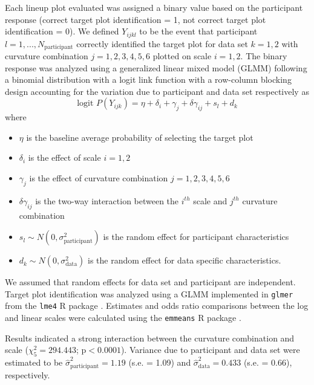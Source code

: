 \documentclass[12pt]{article}
\begin{document}
Each lineup plot evaluated was assigned a binary value based on the
participant response (correct target plot identification = 1, not
correct target plot identification = 0). We defined \(Y_{ijkl}\) to be
the event that participant \(l = 1,...,N_\text{participant}\) correctly
identified the target plot for data set \(k = 1,2\) with curvature
combination \(j = 1,2,3,4,5,6\) plotted on scale \(i = 1,2\). The binary
response was analyzed using a generalized linear mixed model (GLMM)
following a binomial distribution with a logit link function with a
row-column blocking design accounting for the variation due to
participant and data set respectively as \begin{equation}
\text{logit }P(Y_{ijk}) = \eta + \delta_i + \gamma_j + \delta \gamma_{ij} + s_l + d_k
\end{equation} \noindent where

\begin{itemize}
\item $\eta$ is the baseline average probability of selecting the target plot
\item $\delta_i$ is the effect of scale $i = 1,2$
\item $\gamma_j$ is the effect of curvature combination $j = 1,2,3,4,5,6$
\item $\delta\gamma_{ij}$ is the two-way interaction between the $i^{th}$ scale and $j^{th}$ curvature combination
\item $s_l \sim N(0,\sigma^2_\text{participant})$ is the random effect for participant characteristics
\item $d_k \sim N(0,\sigma^2_{\text{data}})$ is the random effect for data specific characteristics. 
\end{itemize}

\noindent We assumed that random effects for data set and participant
are independent. Target plot identification was analyzed using a GLMM
implemented in \texttt{glmer} from the \texttt{lme4} R package
\citep{lme4}. Estimates and odds ratio comparisons between the log and
linear scales were calculated using the \texttt{emmeans} R package
\citep{emmeans}.

Results indicated a strong interaction between the curvature combination
and scale (\(\chi^2_5 = 294.443\); \(\text{p} <0.0001\)). Variance due
to participant and data set were estimated to be
\(\hat\sigma^2_{\text{participant}} = 1.19\) (s.e. = 1.09) and
\(\hat\sigma^2_{\text{data}} = 0.433\) (s.e. = 0.66), respectively.
\end{document}
